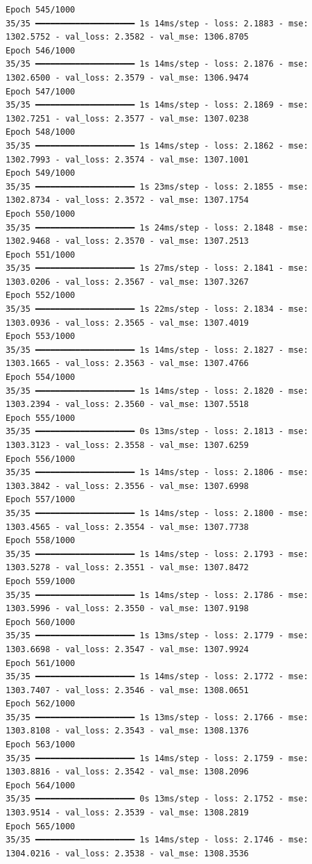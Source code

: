 \documentclass[
  letterpaper,
  DIV=11,
  numbers=noendperiod]{scrreprt}
\begin{document}
\begin{verbatim}
Epoch 545/1000
35/35 ━━━━━━━━━━━━━━━━━━━━ 1s 14ms/step - loss: 2.1883 - mse: 1302.5752 - val_loss: 2.3582 - val_mse: 1306.8705
Epoch 546/1000
35/35 ━━━━━━━━━━━━━━━━━━━━ 1s 14ms/step - loss: 2.1876 - mse: 1302.6500 - val_loss: 2.3579 - val_mse: 1306.9474
Epoch 547/1000
35/35 ━━━━━━━━━━━━━━━━━━━━ 1s 14ms/step - loss: 2.1869 - mse: 1302.7251 - val_loss: 2.3577 - val_mse: 1307.0238
Epoch 548/1000
35/35 ━━━━━━━━━━━━━━━━━━━━ 1s 14ms/step - loss: 2.1862 - mse: 1302.7993 - val_loss: 2.3574 - val_mse: 1307.1001
Epoch 549/1000
35/35 ━━━━━━━━━━━━━━━━━━━━ 1s 23ms/step - loss: 2.1855 - mse: 1302.8734 - val_loss: 2.3572 - val_mse: 1307.1754
Epoch 550/1000
35/35 ━━━━━━━━━━━━━━━━━━━━ 1s 24ms/step - loss: 2.1848 - mse: 1302.9468 - val_loss: 2.3570 - val_mse: 1307.2513
Epoch 551/1000
35/35 ━━━━━━━━━━━━━━━━━━━━ 1s 27ms/step - loss: 2.1841 - mse: 1303.0206 - val_loss: 2.3567 - val_mse: 1307.3267
Epoch 552/1000
35/35 ━━━━━━━━━━━━━━━━━━━━ 1s 22ms/step - loss: 2.1834 - mse: 1303.0936 - val_loss: 2.3565 - val_mse: 1307.4019
Epoch 553/1000
35/35 ━━━━━━━━━━━━━━━━━━━━ 1s 14ms/step - loss: 2.1827 - mse: 1303.1665 - val_loss: 2.3563 - val_mse: 1307.4766
Epoch 554/1000
35/35 ━━━━━━━━━━━━━━━━━━━━ 1s 14ms/step - loss: 2.1820 - mse: 1303.2394 - val_loss: 2.3560 - val_mse: 1307.5518
Epoch 555/1000
35/35 ━━━━━━━━━━━━━━━━━━━━ 0s 13ms/step - loss: 2.1813 - mse: 1303.3123 - val_loss: 2.3558 - val_mse: 1307.6259
Epoch 556/1000
35/35 ━━━━━━━━━━━━━━━━━━━━ 1s 14ms/step - loss: 2.1806 - mse: 1303.3842 - val_loss: 2.3556 - val_mse: 1307.6998
Epoch 557/1000
35/35 ━━━━━━━━━━━━━━━━━━━━ 1s 14ms/step - loss: 2.1800 - mse: 1303.4565 - val_loss: 2.3554 - val_mse: 1307.7738
Epoch 558/1000
35/35 ━━━━━━━━━━━━━━━━━━━━ 1s 14ms/step - loss: 2.1793 - mse: 1303.5278 - val_loss: 2.3551 - val_mse: 1307.8472
Epoch 559/1000
35/35 ━━━━━━━━━━━━━━━━━━━━ 1s 14ms/step - loss: 2.1786 - mse: 1303.5996 - val_loss: 2.3550 - val_mse: 1307.9198
Epoch 560/1000
35/35 ━━━━━━━━━━━━━━━━━━━━ 1s 13ms/step - loss: 2.1779 - mse: 1303.6698 - val_loss: 2.3547 - val_mse: 1307.9924
Epoch 561/1000
35/35 ━━━━━━━━━━━━━━━━━━━━ 1s 14ms/step - loss: 2.1772 - mse: 1303.7407 - val_loss: 2.3546 - val_mse: 1308.0651
Epoch 562/1000
35/35 ━━━━━━━━━━━━━━━━━━━━ 1s 13ms/step - loss: 2.1766 - mse: 1303.8108 - val_loss: 2.3543 - val_mse: 1308.1376
Epoch 563/1000
35/35 ━━━━━━━━━━━━━━━━━━━━ 1s 14ms/step - loss: 2.1759 - mse: 1303.8816 - val_loss: 2.3542 - val_mse: 1308.2096
Epoch 564/1000
35/35 ━━━━━━━━━━━━━━━━━━━━ 0s 13ms/step - loss: 2.1752 - mse: 1303.9514 - val_loss: 2.3539 - val_mse: 1308.2819
Epoch 565/1000
35/35 ━━━━━━━━━━━━━━━━━━━━ 1s 14ms/step - loss: 2.1746 - mse: 1304.0216 - val_loss: 2.3538 - val_mse: 1308.3536

\end{verbatim}
\end{document}

